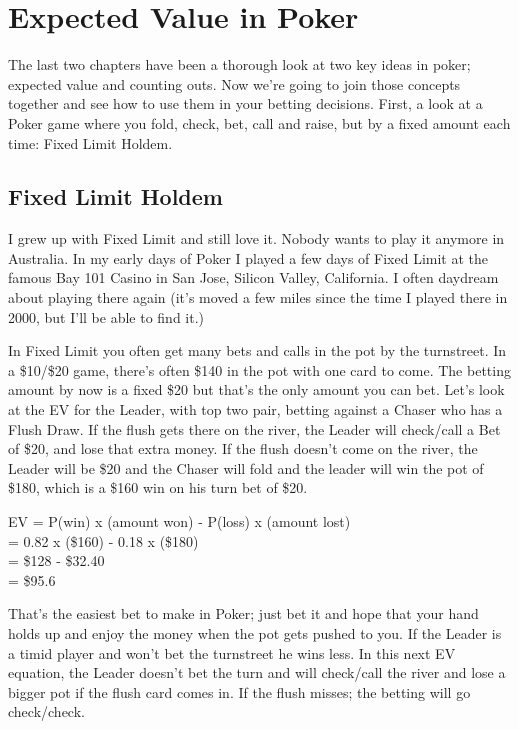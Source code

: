 \chapter{Expected Value in Poker}

The last two chapters have been a thorough look at two key ideas in
poker; expected value and counting outs. Now we're going to join
those concepts together and see how to use them in your betting
decisions. First, a look at a Poker game where you fold, check, bet,
call and raise, but by a fixed amount each time: Fixed Limit Holdem.

\section{Fixed Limit Holdem}

I grew up with Fixed Limit and still love it. Nobody wants to play it
anymore in Australia. In my early days of Poker I played a few days of
Fixed Limit at the famous Bay 101 Casino in San Jose, Silicon Valley,
California. I often daydream about playing there again (it's moved a
few miles since the time I played there in 2000, but I'll be able to
find it.)

In Fixed Limit you often get many bets and calls in the pot by the
turnstreet. In a \$10/\$20 game, there's often \$140 in the pot with
one card to come. The betting amount by now is a fixed \$20 but that's
the only amount you can bet. Let's look at the EV for the Leader,
with top two pair, betting against a Chaser who has a Flush Draw.
If the flush gets there on the river, the Leader will check/call a Bet
of \$20, and lose that extra money. If the flush doesn't come on the
river, the Leader will be \$20 and the Chaser will fold and the leader
will win the pot of \$180, which is a \$160 win on his turn bet of
\$20.

EV = P(win) x (amount won) - P(loss) x (amount lost) \\
   = 0.82   x (\$160)      - 0.18    x (\$180) \\
   = \$128 - \$32.40 \\
   = \$95.6

That's the easiest bet to make in Poker; just bet it and hope that
your hand holds up and enjoy the money when the pot gets pushed to
you. If the Leader is a timid player and won't bet the turnstreet
he wins less. In this next EV equation, the Leader doesn't bet the
turn and will check/call the river and lose a bigger pot if the flush
card comes in. If the flush misses; the betting will go check/check.

